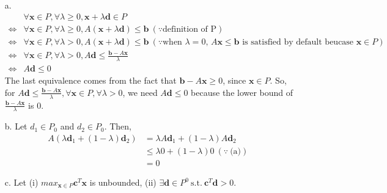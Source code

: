 \documentclass[11pt]{article}
\theoremstyle{remark}
\newcommand{\bx}{\mathbf{x}}
\newcommand{\bd}{\mathbf{d}}
\newcommand{\bc}{\mathbf{c}}
\begin{document}
\color{blue}
\begin{itemize}
\item[a.] 
\begin{align*}
& \forall \bx \in P, \forall \lambda \geq 0, \bx + \lambda \bd \in P &\\
\Leftrightarrow & \forall \bx \in P, \forall \lambda \geq 0, A(\bx + \lambda \bd) \leq \textbf{b} \ (\because \text{definition of P})&\\
\Leftrightarrow & \forall \bx \in P, \forall \lambda > 0, A(\bx + \lambda \bd) \leq \textbf{b} \ (\because \text{when $\lambda=0$, $A\bx \leq \textbf{b}$ is satisfied by default beucase $\bx \in P$}) &\\
\Leftrightarrow & \forall \bx \in P, \forall \lambda > 0, A\bd \leq \frac{\textbf{b}-A\bx}{\lambda} &\\
\Leftrightarrow & A\bd \leq 0 
\end{align*}
The last equivalence comes from the fact that $\textbf{b}-A\bx \geq 0$, since $\bx \in P$. So, for $A\bd \leq \frac{\textbf{b}-A \bx}{\lambda}, \forall \bx \in P, \forall \lambda >0$, we need $A\bd \leq 0$ because the lower bound of $\frac{\textbf{b}-A \bx}{\lambda}$ is 0.

\item[b.]
Let $d_1 \in P_0$ and $d_2 \in P_0$. Then,
\begin{align*}
A(\lambda \bd_1 + (1-\lambda) \bd_2) &= \lambda A\bd_1 + (1-\lambda) A \bd_2 &\\
&\leq \lambda 0 + (1-\lambda) 0 \ (\because \ \text{(a)}) &\\
&= 0
\end{align*}

\item[c.]
Let (i) $max_{\bx \in P} \bc^T \bx$ is unbounded, (ii) $\exists \bd \in P^0 \ \text{s.t.} \ \bc^T\bd > 0$.


\end{itemize}
\end{document}
